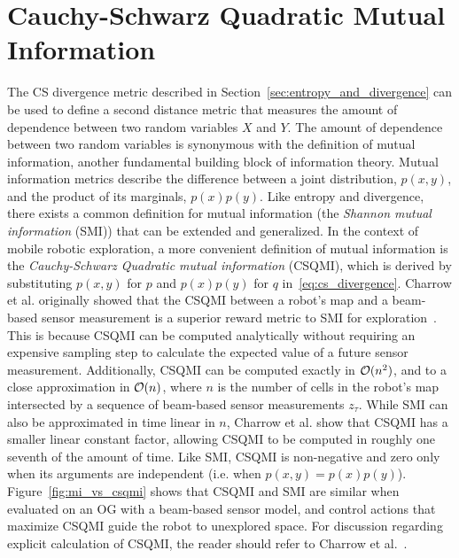 \section{Cauchy-Schwarz Quadratic Mutual Information}
\label{sec:csqmi}

The CS divergence metric described in Section~\ref{sec:entropy_and_divergence} can be
used to define a second distance metric that measures the amount of dependence
between two random variables $X$ and $Y$. The amount of dependence between two
random variables is synonymous with the definition of mutual information, another
fundamental building block of information theory. Mutual information metrics
describe the difference between a joint distribution, $p(x, y)$, and the product
of its marginals, $p(x)p(y)$. Like entropy and divergence, there exists a common
definition for mutual information (the \textit{Shannon mutual information} (SMI)) that can be
extended and generalized. In the context of mobile robotic exploration, a more convenient
definition of mutual information is the \textit{Cauchy-Schwarz Quadratic mutual
information} (CSQMI), which is derived
by substituting $p(x, y)$ for $p$ and $p(x)p(y)$ for $q$
in~\eqref{eq:cs_divergence}.
%
%
Charrow et al. originally showed that the CSQMI between a robot's map and a beam-based
sensor measurement is a superior reward metric to SMI for
exploration~\cite{charrow2015icra}. This is because CSQMI can be computed
analytically without requiring an expensive sampling step to
calculate the expected value of a future sensor measurement. Additionally,
CSQMI can be computed exactly in $\mathcal{O}(n^2)$, and to a close approximation
in $\mathcal{O}(n)$, where $n$ is the number of cells in the robot's map intersected by a
sequence of beam-based sensor measurements $z_{\tau}$. While SMI can also be approximated in time linear in
$n$, Charrow et al. show that CSQMI has a smaller linear constant factor,
allowing CSQMI to be computed in roughly one seventh of the amount of time.
Like SMI, CSQMI is non-negative and zero only when its arguments are independent
(i.e. when $p(x, y) = p(x)p(y)$). Figure~\ref{fig:mi_vs_csqmi} shows that CSQMI and SMI are
similar when evaluated on an OG with a beam-based sensor model, and control actions
that maximize CSQMI guide the robot to unexplored space. For discussion regarding
explicit calculation of CSQMI, the reader should refer to Charrow et al.~\cite{charrow2015icra}.

